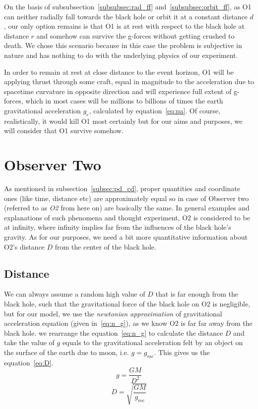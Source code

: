 On the basis of subsubsection~\ref{subsubsec:rad_ff} and~\ref{subsubsec:orbit_ff}, as O1 can neither radially fall towards the black hole or orbit it at a constant distance \(d\), 
our only option remains is that O1 is at rest with respect to the black hole at distance \(r\) and somehow can survive the g-forces without getting crushed to death. We chose this 
scenario because in this case the problem is subjective in nature and has nothing to do with the underlying physics of our experiment. 

In order to remain at rest at close distance to the event horizon, O1 will be applying thrust through some craft, equal in magnitude to the acceleration due 
to spacetime curvature in opposite direction and will experience full extent of g-forces, which in most cases will be millions to billions of times the earth 
gravitational acceleration \(g_e\), calculated by equation~\ref{eq:pa}. Of course, realistically, it would kill O1 most certainly but for our aims and purposes, 
we will consider that O1 survive somehow. 

\section{Observer Two }\label{sec:o2}

As mentioned in subsection~\ref{subsec:pd_cd}, proper quantities and coordinate ones (like time, distance etc) are approximately equal so in case of Observer two (referred to as
\emph{O2} from here on) are basically the same. In general examples and explanations of such phenomena and thought experiment, O2 is considered to be at infinity, where infinity implies far from the influences of the black hole's gravity. 
As for our purposes, we need a bit more quantitative information about O2's distance \(D\) from the center of the black hole. 

\subsection{Distance}\label{subsec:D}
We can always assume a random high value of \(D\) that is far enough from the black hole, such that the gravitational force of the black hole on O2 is negligible, but for our model, 
we use the \emph{newtonian approximation} of gravitational acceleration equation (given in~\ref{eq:n_g}), as we know O2 is far far away from the black hole. we
rearrange the equation~\ref{eq:n_g} to calculate the distance \(D\) and take the value of \(g\) equals to the gravitational acceleration felt by an object on the surface of the earth 
due to moon, i.e. \(g = g_{me}\). This gives us the equation~\ref{eq:D}.
\begin{equation}\label{eq:n_g}
    g = \frac{GM}{D^2} \tag{3.12}
\end{equation}
\begin{equation}\label{eq:D}
    D = \sqrt{\frac{GM}{g_{me}}} \tag{3.13}
\end{equation}

